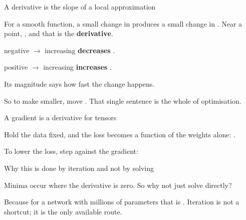 \documentclass[aspectratio=169,11pt,t]{beamer}
\begin{document}
\begin{frame}[shrink=25]{A derivative is the slope of a local approximation}
{\fontsize{9.4}{12.6}\selectfont\color{fg2}For a smooth function, a small change in  produces a small change in . Near a point, , and that  is the \textbf{derivative}.\par}\vskip 4pt
\begin{ibullets}
\item {} negative $\rightarrow$ increasing  \textbf{decreases} .
\item {} positive $\rightarrow$ increasing  \textbf{increases} .
\item Its magnitude says how fast the change happens.
\end{ibullets}
\begin{iband}[signal]
So to make  smaller, move  . That single sentence is the whole of optimisation.
\end{iband}
\end{frame}

\begin{frame}[shrink=25]{A gradient is a derivative for tensors}
{\fontsize{9.4}{12.6}\selectfont\color{fg2}Hold the data fixed, and the loss becomes a function of the weights alone: .\par}\vskip 4pt
\begin{iband}[signal]
To lower the loss, step against the gradient: 
\end{iband}
\end{frame}

\begin{frame}[shrink=25]{Why this is done by iteration and not by solving}
{\fontsize{9.4}{12.6}\selectfont\color{fg2}Minima occur where the derivative is zero. So why not just solve  directly?\par}\vskip 4pt
\begin{iband}[rose]
Because for a network with millions of parameters that is . Iteration is not a shortcut; it is the only available route.
\end{iband}
\end{frame}
\end{document}
